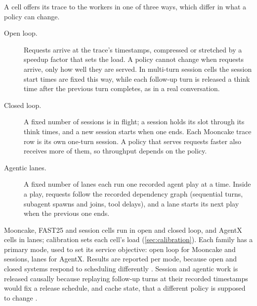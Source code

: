 A cell offers its trace to the workers in one of three ways, which differ in what a policy can
change.
\begin{description}
  \item[Open loop.] Requests arrive at the trace's timestamps, compressed or stretched by a speedup
    factor that sets the load. A policy cannot change when requests arrive, only how well they are
    served. In multi-turn session cells the session start times are fixed this way, while each
    follow-up turn is released a think time after the previous turn completes, as in a real
    conversation.
  \item[Closed loop.] A fixed number of sessions is in flight; a session holds its slot through its
    think times, and a new session starts when one ends. Each Mooncake trace row is its own
    one-turn session. A policy that serves requests faster also receives more of them, so
    throughput depends on the policy.
  \item[Agentic lanes.] A fixed number of lanes each run one recorded agent play at a time. Inside
    a play, requests follow the recorded dependency graph (sequential turns, subagent spawns and
    joins, tool delays), and a lane starts its next play when the previous one ends.
\end{description}
Mooncake, FAST25 and session cells run in open and closed loop, and AgentX cells in lanes;
calibration sets each cell's load (\cref{sec:calibration}). Each family has a primary mode, used to
set its service objective: open loop for Mooncake and sessions, lanes for AgentX.
Results are reported per mode, because open and closed systems respond to scheduling differently
\citep{schroeder2006open}. Session and
agentic work is released causally because replaying follow-up turns at their recorded timestamps
would fix a release schedule, and cache state, that a different policy is supposed to change
\citep{rajib2026agentservesim,alomar2023causalsim}.

